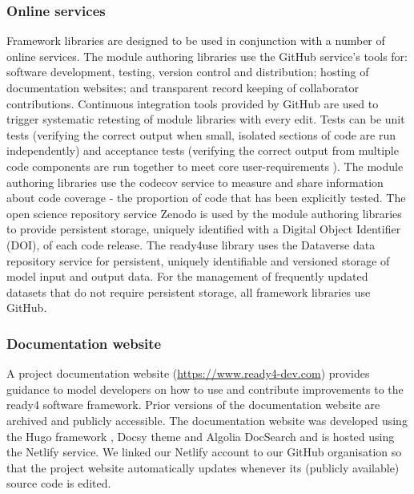 \documentclass[sn-vancouver,Numbered,pdflatex]{sn-jnl}
\theoremstyle{remark}
\theoremstyle{definition}
\begin{document}
\hypertarget{online-services}{%
\subsubsection{Online services}\label{online-services}}

Framework libraries are designed to be used in conjunction with a number of online services. The module authoring libraries use the GitHub \citep{github2007} service's tools for: software development, testing, version control and distribution; hosting of documentation websites; and transparent record keeping of collaborator contributions. Continuous integration \citep{CI2017} tools provided by GitHub are used to trigger systematic retesting of module libraries with every edit. Tests can be unit tests (verifying the correct output when small, isolated sections of code are run independently) and acceptance tests (verifying the correct output from multiple code components are run together to meet core user-requirements \citep{martin2003agile}). The module authoring libraries use the codecov \citep{codecov_2022} service to measure and share information about code coverage \citep{ERICWONG2010188} - the proportion of code that has been explicitly tested. The open science repository service Zenodo \citep{Zenodo2013} is used by the module authoring libraries to provide persistent storage, uniquely identified with a Digital Object Identifier (DOI), of each code release. The ready4use library uses the Dataverse \citep{Dataverse2007} data repository service for persistent, uniquely identifiable and versioned storage of model input and output data. For the management of frequently updated datasets that do not require persistent storage, all framework libraries use GitHub.

\hypertarget{documentation-website}{%
\subsubsection{Documentation website}\label{documentation-website}}

A project documentation website (\url{https://www.ready4-dev.com}) provides guidance to model developers on how to use and contribute improvements to the ready4 software framework. Prior versions of the documentation website are archived and publicly accessible. The documentation website was developed using the Hugo framework \citep{hugo_2023}, Docsy theme \citep{docsy_2023} and Algolia DocSearch \citep{algoliadocsearch_2023} and is hosted using the Netlify \citep{netlify_2023} service. We linked our Netlify account to our GitHub organisation so that the project website automatically updates whenever its (publicly available) source code is edited.
\end{document}
